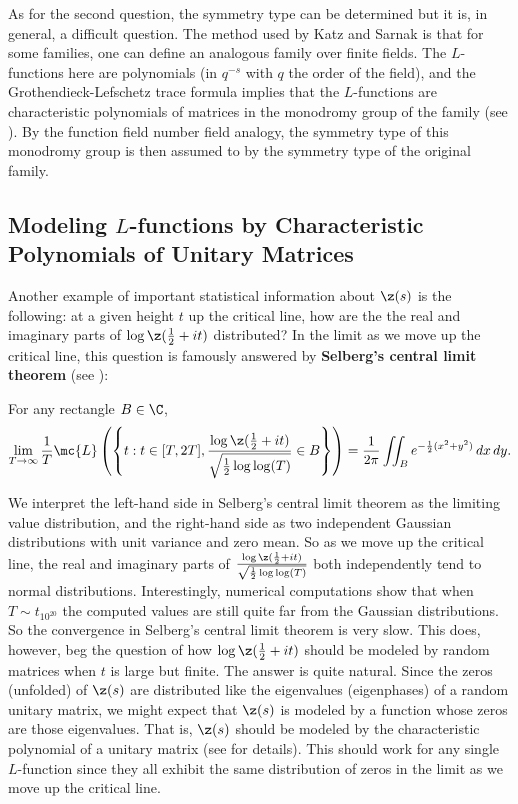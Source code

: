       As for the second question, the symmetry type can be determined but it is, in general, a difficult question. The method used by Katz and Sarnak is that for some families, one can define an analogous family over finite fields. The $L$-functions here are polynomials (in $q^{-s}$ with $q$ the order of the field), and the Grothendieck-Lefschetz trace formula implies that the $L$-functions are characteristic polynomials of matrices in the monodromy group of the family (see ). By the function field number field analogy, the symmetry type of this monodromy group is then assumed to by the symmetry type of the original family.
    \subsection*{Modeling $L$-functions by Characteristic Polynomials of Unitary Matrices}
      Another example of important statistical information about $\z(s)$ is the following: at a given height $t$ up the critical line, how are the the real and imaginary parts of $\log\z(\frac{1}{2}+it)$ distributed? In the limit as we move up the critical line, this question is famously answered by \textbf{Selberg's central limit theorem} (see ):

      \begin{theorem}
        For any rectangle $B \in \C$,
        \[
          \lim_{T \to \infty}\frac{1}{T}\mc{L}\left(\left\{t:t \in [T,2T],\frac{\log\z(\frac{1}{2}+it)}{\sqrt{\frac{1}{2}\log\log(T)}} \in B\right\}\right) = \frac{1}{2\pi}\iint_{B}e^{-\frac{1}{2}(x^{2}+y^{2})}\,dx\,dy.
        \]
      \end{theorem}

      We interpret the left-hand side in Selberg's central limit theorem as the limiting value distribution, and the right-hand side as two independent Gaussian distributions with unit variance and zero mean. So as we move up the critical line, the real and imaginary parts of $\frac{\log\z(\frac{1}{2}+it)}{\sqrt{\frac{1}{2}\log\log(T)}}$ both independently tend to normal distributions. Interestingly, numerical computations show that when $T \sim t_{10^{20}}$ the computed values are still quite far from the Gaussian distributions. So the convergence in Selberg's central limit theorem is very slow. This does, however, beg the question of how $\log\z(\frac{1}{2}+it)$ should be modeled by random matrices when $t$ is large but finite. The answer is quite natural. Since the zeros (unfolded) of $\z(s)$ are distributed like the eigenvalues (eigenphases) of a random unitary matrix, we might expect that $\z(s)$ is modeled by a function whose zeros are those eigenvalues. That is, $\z(s)$ should be modeled by the characteristic polynomial of a unitary matrix (see  for details). This should work for any single $L$-function since they all exhibit the same distribution of zeros in the limit as we move up the critical line.

